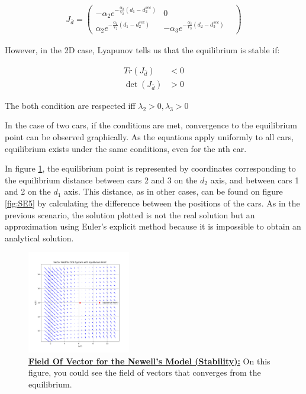 \documentclass{article}
\begin{document}
	

	
	\begin{align*}
	\boxed{	J_{\bar{d}}=\begin{pmatrix}
			-\alpha_2e^{-\frac{\alpha_2}{V_2}(d_1 - d_{2}^{sec})} & 0 & \\
			\alpha_2e^{-\frac{\alpha_2}{V_2}(d_1 - d_{2}^{sec})} & -\alpha_3e^{-\frac{\alpha_3}{V_3}(d_2 - d_{3}^{sec})} &
	\end{pmatrix}}
	\end{align*}
	
	However, in the 2D case, Lyapunov tells us that the equilibrium is stable if:
	
	\[
	\boxed{
		\begin{aligned}
			Tr(J_{\bar{d}}) &< 0 \\
			\det(J_{\bar{d}}) &> 0
		\end{aligned}
	}
	\]

	The both condition are respected iff $\lambda_2>0, \lambda_3>0$
	 \newline\newline
	 
	In the case of two cars, if the conditions are met, convergence to the equilibrium point can be observed graphically. As the equations apply uniformly to all cars, equilibrium exists under the same conditions, even for the nth car.
	
	In figure \ref{fig:SE4}, the equilibrium point is represented by coordinates corresponding to the equilibrium distance between cars 2 and 3 on the $d_2$ axis, and between cars 1 and 2 on the $d_1$ axis. This distance, as in other cases, can be found on figure \ref{fig:SE5} by calculating the difference between the positions of the cars. As in the previous scenario, the solution plotted is not the real solution but an approximation using Euler's explicit method because it is impossible to obtain an analytical solution.
	 
	 
	 \begin{figure}[H]
	 	\centering
	 	\includegraphics[width=0.40\textwidth]{VectorField1.png}
	 	\caption[Field Of Vector for the Newell's Model (Stability):]{\textbf{\underline{Field Of Vector for the Newell's Model (Stability):}} On this figure, you could see the field of vectors that converges from the equilibrium.}
	 	\label{fig:SE4}
	 \end{figure}
	 
\end{document}

